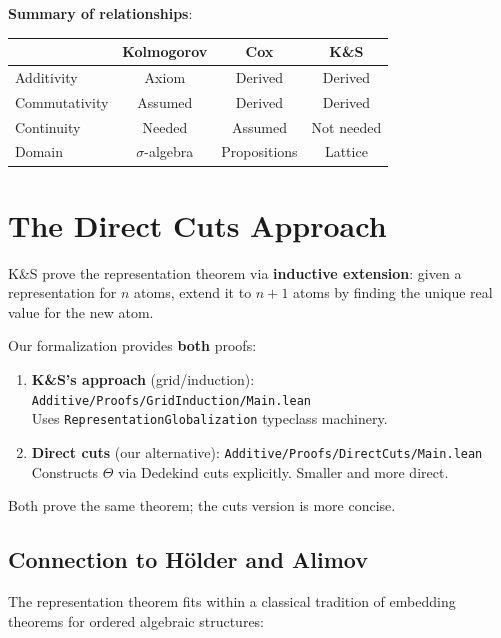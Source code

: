 \documentclass[11pt]{article}
\theoremstyle{definition}
\theoremstyle{remark}
\begin{document}
\textbf{Summary of relationships}:
\begin{center}
\begin{tabular}{lccc}
& Kolmogorov & Cox & K\&S \\
\hline
Additivity & Axiom & Derived & Derived \\
Commutativity & Assumed & Derived & Derived \\
Continuity & Needed & Assumed & Not needed \\
Domain & $\sigma$-algebra & Propositions & Lattice \\
\end{tabular}
\end{center}

\section{The Direct Cuts Approach}
\label{app:directcuts}

K\&S prove the representation theorem via \textbf{inductive extension}: given a representation for $n$ atoms, extend it to $n+1$ atoms by finding the unique real value for the new atom.

Our formalization provides \textbf{both} proofs:
\begin{enumerate}
\item \textbf{K\&S's approach} (grid/induction): \texttt{Additive/Proofs/GridInduction/Main.lean} \\
  Uses \texttt{RepresentationGlobalization} typeclass machinery.

\item \textbf{Direct cuts} (our alternative): \texttt{Additive/Proofs/DirectCuts/Main.lean} \\
  Constructs $\Theta$ via Dedekind cuts explicitly. Smaller and more direct.
\end{enumerate}

Both prove the same theorem; the cuts version is more concise.

\subsection{Connection to Hölder and Alimov}

The representation theorem fits within a classical tradition of embedding theorems for ordered algebraic structures:
\end{document}
